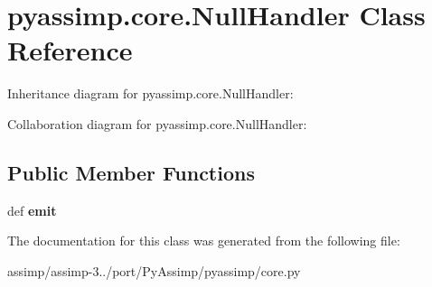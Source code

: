 \hypertarget{classpyassimp_1_1core_1_1_null_handler}{\section{pyassimp.\+core.\+Null\+Handler Class Reference}
\label{classpyassimp_1_1core_1_1_null_handler}
}


Inheritance diagram for pyassimp.\+core.\+Null\+Handler\+:


Collaboration diagram for pyassimp.\+core.\+Null\+Handler\+:
\subsection*{Public Member Functions}
\begin{DoxyCompactItemize}
\item 
\hypertarget{classpyassimp_1_1core_1_1_null_handler_a98f9b194da810fd775bb98c54c72bf23}{def {\bfseries emit}}\label{classpyassimp_1_1core_1_1_null_handler_a98f9b194da810fd775bb98c54c72bf23}

\end{DoxyCompactItemize}


The documentation for this class was generated from the following file\+:\begin{DoxyCompactItemize}
\item 
assimp/assimp-\/3../port/\+Py\+Assimp/pyassimp/core.\+py\end{DoxyCompactItemize}

